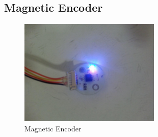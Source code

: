 \subsection{Magnetic Encoder}

\begin{figure}
	\centering
	\includegraphics[width=0.6\textwidth]{images/MAG_ENC.jpg}
	\caption{Magnetic Encoder}
	\label{fig:SIMPLE_SENDER}
\end{figure}\\


